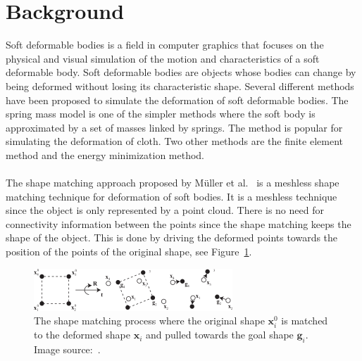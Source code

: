 \section{Background}
    Soft deformable bodies is a field in computer graphics that focuses on the physical and visual simulation of the motion and characteristics of a soft deformable body.
    Soft deformable bodies are objects whose bodies can change by being deformed without losing its characteristic shape.
    Several different methods have been proposed to simulate the deformation of soft deformable bodies.
    The spring mass model is one of the simpler methods where the soft body is approximated by a set of masses linked by springs.
    The method is popular for simulating the deformation of cloth.
    Two other methods are the finite element method and the energy minimization method. \\ \\ The shape matching approach proposed by M\"uller et al.~\cite{shapematching} is a meshless shape matching technique for deformation of soft bodies.
    It is a meshless technique since the object is only represented by a point cloud.
    There is no need for connectivity information between the points since the shape matching keeps the shape of the object.
    This is done by driving the deformed points towards the position of the points of the original shape, see Figure~\ref{fig:def}.
    
    \begin{figure}
    \includegraphics[width=\linewidth]{img/deformation2.png}
    \caption{The shape matching process where the original shape $\mathbf{x}^0_i$ is matched to the deformed shape $\mathbf{x}_i$ and pulled towards the goal shape $\mathbf{g}_i$. Image source:~\cite{shapematching}.}
    \label{fig:def}
    \end{figure}
    

